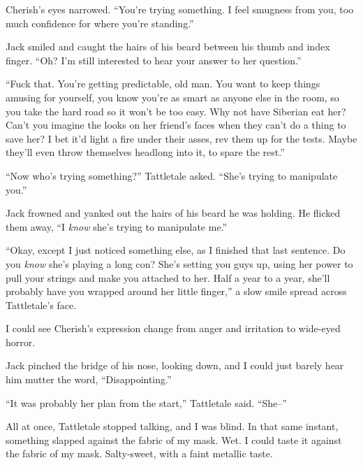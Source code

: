 Cherish's eyes narrowed.  ``You're trying something.  I feel smugness from you, too much confidence for where you're standing.''



Jack smiled and caught the hairs of his beard between his thumb and index finger.  ``Oh?  I'm still interested to hear your answer to her question.''



``Fuck that.  You're getting predictable, old man.  You want to keep things amusing for yourself, you know you're as smart as anyone else in the room, so you take the hard road so it won't be too easy.  Why not have Siberian eat her?  Can't you imagine the looks on her friend's faces when they can't do a thing to save her?  I bet it'd light a fire under their asses, rev them up for the tests.  Maybe they'll even throw themselves headlong into it, to spare the rest.''



``Now who's trying something?'' Tattletale asked.  ``She's trying to manipulate you.''



Jack frowned and yanked out the hairs of his beard he was holding.  He flicked them away, ``I \emph{know} she's trying to manipulate me.''



``Okay, except I just noticed something else, as I finished that last sentence.  Do you \emph{know} she's playing a long con?  She's setting you guys up, using her power to pull your strings and make you attached to her.  Half a year to a year, she'll probably have you wrapped around her little finger,'' a slow smile spread across Tattletale's face.



I could see Cherish's expression change from anger and irritation to wide-eyed horror.



Jack pinched the bridge of his nose, looking down, and I could just barely hear him mutter the word, ``Disappointing.''



``It was probably her plan from the start,'' Tattletale said.  ``She--''



All at once, Tattletale stopped talking, and I was blind.  In that same instant, something slapped against the fabric of my mask.  Wet.  I could taste it against the fabric of my mask.  Salty-sweet, with a faint metallic taste.



